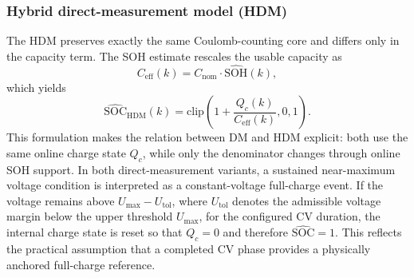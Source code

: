 \documentclass[review,nopreprintline]{elsarticle}
\begin{document}
\subsubsection*{Hybrid direct-measurement model (HDM)}
The HDM preserves exactly the same Coulomb-counting core and differs only in the capacity term. The SOH estimate rescales the usable capacity as
\begin{equation}
    C_{\mathrm{eff}}(k)=C_{\mathrm{nom}} \cdot \widehat{\mathrm{SOH}}(k),
    \label{eq:ceff}
\end{equation}
which yields
\begin{equation}
    \widehat{\mathrm{SOC}}_{\mathrm{HDM}}(k)=\mathrm{clip}\!\left(1+\frac{Q_c(k)}{C_{\mathrm{eff}}(k)},0,1\right).
    \label{eq:soc_hdm}
\end{equation}
This formulation makes the relation between DM and HDM explicit: both use the same online charge state $Q_c$, while only the denominator changes through online SOH support. In both direct-measurement variants, a sustained near-maximum voltage condition is interpreted as a constant-voltage full-charge event. If the voltage remains above $U_{\max}-U_{\mathrm{tol}}$, where $U_{\mathrm{tol}}$ denotes the admissible voltage margin below the upper threshold $U_{\max}$, for the configured CV duration, the internal charge state is reset so that $Q_c=0$ and therefore $\widehat{\mathrm{SOC}}=1$. This reflects the practical assumption that a completed CV phase provides a physically anchored full-charge reference.
\end{document}
